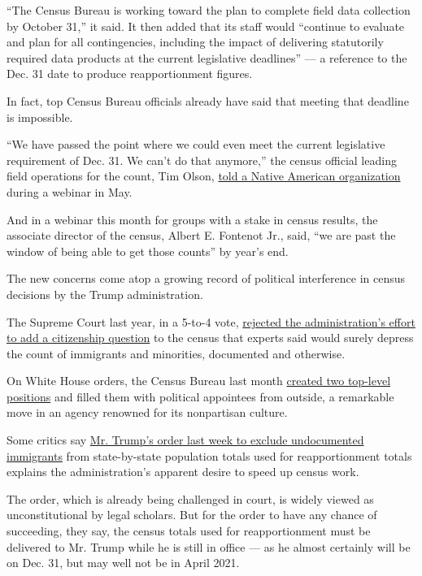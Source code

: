 ``The Census Bureau is working toward the plan to complete field data
collection by October 31,'' it said. It then added that its staff would
``continue to evaluate and plan for all contingencies, including the
impact of delivering statutorily required data products at the current
legislative deadlines'' --- a reference to the Dec. 31 date to produce
reapportionment figures.

In fact, top Census Bureau officials already have said that meeting that
deadline is impossible.

``We have passed the point where we could even meet the current
legislative requirement of Dec. 31. We can't do that anymore,'' the
census official leading field operations for the count, Tim Olson,
\href{https://www.youtube.com/watch?v=F6IyJMtDDgY\&feature=youtu.be\&t=4688}{told
a Native American organization} during a webinar in May.

And in a webinar this month for groups with a stake in census results,
the associate director of the census, Albert E. Fontenot Jr., said, ``we
are past the window of being able to get those counts'' by year's end.

The new concerns come atop a growing record of political interference in
census decisions by the Trump administration.

The Supreme Court last year, in a 5-to-4 vote,
\href{https://www.nytimes3xbfgragh.onion/2019/06/27/us/politics/supreme-court-gerrymandering-census.html}{rejected
the administration's effort to add a citizenship question} to the census
that experts said would surely depress the count of immigrants and
minorities, documented and otherwise.

On White House orders, the Census Bureau last month
\href{https://www.nytimes3xbfgragh.onion/2020/06/23/us/census-bureau-cogley-korzeniewski.html}{created
two top-level positions} and filled them with political appointees from
outside, a remarkable move in an agency renowned for its nonpartisan
culture.

Some critics say
\href{https://www.nytimes3xbfgragh.onion/2020/07/21/us/politics/trump-immigrants-census-redistricting.html}{Mr.
Trump's order last week to exclude undocumented immigrants} from
state-by-state population totals used for reapportionment totals
explains the administration's apparent desire to speed up census work.

The order, which is already being challenged in court, is widely viewed
as unconstitutional by legal scholars. But for the order to have any
chance of succeeding, they say, the census totals used for
reapportionment must be delivered to Mr. Trump while he is still in
office --- as he almost certainly will be on Dec. 31, but may well not
be in April 2021.

